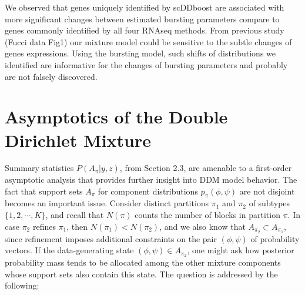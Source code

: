 \documentclass[aoas,preprint]{imsart}
\begin{document}

We observed that genes uniquely identified by scDDboost are associated with more significant changes between estimated bursting parameters compare to genes commonly identified by all four RNAseq methods. From previous study (Fucci data Fig1) our mixture model could be sensitive to the subtle changes of genes expressions. Using the bursting model, such shifts of distributions we identified are informative for the changes of bursting parameters and probably are not falsely discovered.


\section{Asymptotics of the Double Dirichlet Mixture}

Summary statistics $P(A_\pi|y,z)$, from Section 2.3, are amenable to a first-order asymptotic analysis
that provides further insight into DDM model behavior.  The fact that support sets $A_\pi$ for component 
distributions $p_\pi( \phi,\psi)$ are not disjoint becomes an important issue.  Consider
distinct partitions $\pi_1$ and $\pi_2$  of subtypes $\{ 1, 2, \cdots, K\}$, and recall that $N(\pi)$ counts
 the number of blocks in partition $\pi$.   In case $\pi_2$ refines $\pi_1$, then $N(\pi_1) < N(\pi_2)$,
and  we also know that 
 $A_{\pi_2} \subset A_{\pi_1}$, since refinement 
imposes additional constraints on the pair $(\phi, \psi)$ of probability vectors.   
If the data-generating state $(\phi, \psi) \in A_{\pi_2}$, one might ask how posterior probability mass
tends to be allocated among the other mixture components whose
 support sets also contain this state.     The question is addressed 
by the following:
\end{document}
